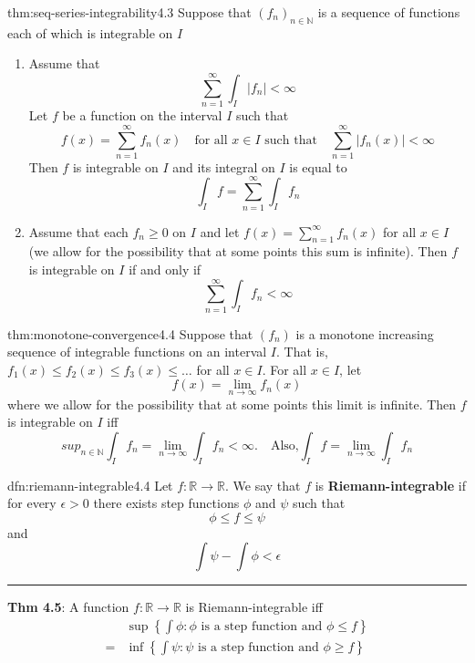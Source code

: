 \documentclass[landscape, 8pt]{extarticle}
\begin{document}
\begin{multicols}{3}
\begin{thm}{thm:seq-series-integrability}{4.3}
	Suppose that $(f_{n})_{n\in\mathbb{N}}$ is a sequence of functions each of which is integrable on $I$
	\begin{enumerate}
		\setlength\itemsep{0em}
		\item Assume that
		\[\sum_{n=1}^{\infty} \int_{I} \lvert f_{n} \rvert <\infty\]
		Let $f$ be a function on the interval $I$ such that
		\[f(x)=\sum_{n=1}^{\infty} f_{n}(x)\quad\text{for all } x\in I\text{ such that}\quad \sum_{n=1}^{\infty} \lvert f_{n}(x) \rvert <\infty\]
		Then $f$ is integrable on $I$ and its integral on $I$ is equal to
		\[\int_{I} f=\sum_{n=1}^{\infty} \int_{I} f_{n}\]
		\item Assume that each $f_{n}\ge 0$ on $I$ and let $f(x)=\sum_{n=1}^{\infty}f_{n}(x)$ for all $x\in I$ (we allow for the possibility that at some points this sum is infinite). Then $f$ is integrable on $I$ if and only if
		\[\sum_{n=1}^{\infty} \int_{I} f_{n}<\infty\]
	\end{enumerate}
\end{thm}

\begin{thm}{thm:monotone-convergence}{4.4}
	Suppose that $(f_{n})$ is a monotone increasing sequence of integrable functions on an interval $I$. That is, $f_{1}(x) \le f_{2}(x) \le f_{3}(x) \le \dots$ for all $x\in I$. For all $x\in I$, let
	\[f(x) = \lim_{n\to \infty} f_{n}(x)\]
	where we allow for the possibility that at some points this limit is infinite. Then $f$ is integrable on $I$ iff
	\[sup_{n\in \mathbb{N}} \int_{I} f_{n} = \lim_{n\to \infty} \int_{I} f_{n} < \infty. \quad \text{Also,} \int_{I} f = \lim_{n\to \infty} \int_{I} f_{n}\]
\end{thm}

\newpage

\begin{dfn}{dfn:riemann-integrable}{4.4}
	\vspace{-5pt}
	Let $f : \mathbb{R} \to \mathbb{R}$. We say that $f$ is \textbf{Riemann-integrable} if for every $\epsilon > 0$ there exists step functions $\phi$ and $\psi$ such that
	\[\phi \le f \le \psi\]
	and
	\[\int \psi - \int \phi < \epsilon\]

	\noindent\rule{\textwidth}{0.2pt}
	\textbf{Thm 4.5}: A function $f : \mathbb{R}\to \mathbb{R}$ is Riemann-integrable iff
	\begin{align*}
		& \sup \left\{\int \phi : \text{$\phi$ is a step function and $\phi \le f$}\right\} \\
		= & \inf \left\{\int \psi : \text{$\psi$ is a step function and $\phi \ge f$}\right\}
	\end{align*}


\end{dfn}
\end{multicols}
\end{document}
